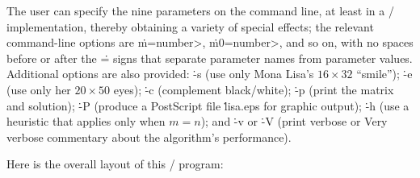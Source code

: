 The user can specify the nine parameters 
on the command line, at least in a \UNIX/ implementation, thereby
obtaining a variety of special effects; the relevant
command-line options are \.{m=}\<number>, \.{m0=}\<number>, and so on,
with no spaces before or after the \.= signs that separate parameter
names from parameter values. Additional options are also provided:
\.{-s} (use only Mona Lisa's $16\times32$ ``smile'');
\.{-e} (use only her $20\times50$ eyes);
\.{-c} (complement black/white); \.{-p} (print the matrix and solution);
\.{-P} (produce a PostScript file \.{lisa.eps} for graphic output);
\.{-h} (use a heuristic that applies only when $m=n$); and
\.{-v} or \.{-V} (print verbose or Very verbose commentary about the
algorithm's performance).

Here is the overall layout of this \CEE/ program:

